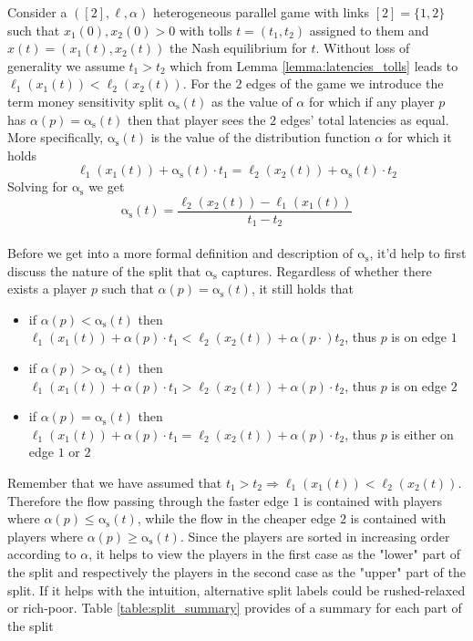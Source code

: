 \documentclass[10pt,a4paper]{book}
\newcommand{\as}{\mathrm{\alpha_s}}
\theoremstyle{definition}
\theoremstyle{comment}
\begin{document}
Consider a $([2], \ell, \alpha)$ heterogeneous parallel game with links $[2] = \{1, 2\}$ such that $x_1(0), x_2(0) > 0$ with tolls $t = (t_1, t_2)$ assigned to them and  $x(t) = (x_1(t), x_2(t))$ the Nash equilibrium for $t$.
Without loss of generality we assume $t_1 > t_2$ which from Lemma \ref{lemma:latencies_tolls} leads to $\ell_1(x_1(t)) < \ell_2(x_2(t))$.
For the $2$ edges of the game we introduce the term money sensitivity split $\as(t)$ as the value of $\alpha$ for which if any player $p$ has $\alpha(p)=\as(t)$ then that player sees the $2$ edges' total latencies as equal.
More specifically, $\as(t)$ is the value of the distribution function $\alpha$ for which it holds
\[\ell_1(x_1(t)) + \as(t) \cdot t_1 = \ell_2(x_2(t)) + \as(t) \cdot t_2\]
Solving for $\as$ we get
\[\as(t) = \frac{\ell_2(x_2(t)) - \ell_1(x_1(t))}{t_1 - t_2}\]
\\
Before we get into a more formal definition and description of $\as$, it'd help to first discuss the nature of the split that $\as$ captures.
Regardless of whether there exists a player $p$ such that $\alpha(p) = \as(t)$, it still holds that
\begin{itemize}
	\item if $\alpha(p) < \as(t)$ then $\ell_1(x_1(t)) + \alpha(p) \cdot t_1 < \ell_2(x_2(t)) + \alpha(p \cdot) t_2$, thus $p$ is on edge $1$
	\item if $\alpha(p) > \as(t)$ then $\ell_1(x_1(t)) + \alpha(p) \cdot t_1 > \ell_2(x_2(t)) + \alpha(p) \cdot t_2$, thus $p$ is on edge $2$
	\item if $\alpha(p) = \as(t)$ then $\ell_1(x_1(t)) + \alpha(p) \cdot t_1 = \ell_2(x_2(t)) + \alpha(p) \cdot t_2$, thus $p$ is either on edge $1$ or $2$
\end{itemize}
Remember that we have assumed that $t_1 > t_2 \Rightarrow \ell_1(x_1(t)) < \ell_2(x_2(t))$.
Therefore the flow passing through the faster edge $1$ is contained with players where $\alpha(p) \le \as(t)$, while the flow in the cheaper edge $2$ is contained with players where $\alpha(p) \ge \as(t)$.
Since the players are sorted in increasing order according to $\alpha$, it helps to view the players in the first case as the "lower" part of the split and respectively the players in the second case as the "upper" part of the split.
If it helps with the intuition, alternative split labels could be rushed-relaxed or rich-poor.
Table \autoref{table:split_summary} provides of a summary for each part of the split
\end{document}
